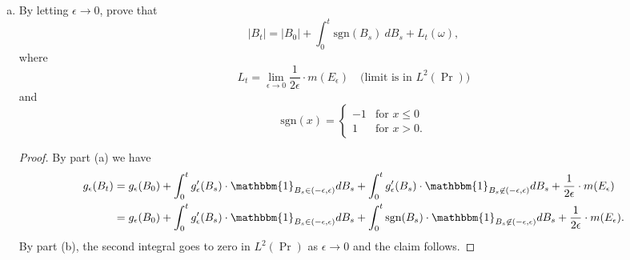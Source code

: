 \documentclass[11pt,letterpaper]{report}
\newcommand{\ind}{\mathbbm{1}}
\newcommand{\sgn}{\text{sgn}}
\begin{document}
\begin{enumerate}[(a)]
	\item By letting $\epsilon\to 0$, prove that
	\[
	|B_t| = |B_0| + \int_0^t \sgn(B_s)\ dB_s + L_t(\omega),
	\]
	where
	\[
	L_t = \lim_{\epsilon\to 0}\frac{1}{2\epsilon}\cdot m(E_\epsilon)\quad\text{(limit is in $L^2(\Pr)$)}
	\]
	and
	\[
	\sgn(x) = \begin{cases}
		-1&\text{for }x\leq 0\\
		1&\text{for }x>0.
	\end{cases}
	\]
	\begin{proof}
		By part (a) we have
		\begin{align*}
		g_\epsilon(B_t) &= g_\epsilon(B_0) + \int_0^tg_\epsilon'(B_s)\cdot \ind_{B_s\in (-\epsilon, \epsilon)}dB_s + \int_0^tg_\epsilon'(B_s)\cdot \ind_{B_s\not\in (-\epsilon, \epsilon)}dB_s + \frac{1}{2\epsilon}\cdot m(E_\epsilon)\\
		&= g_\epsilon(B_0) + \int_0^tg'_\epsilon(B_s)\cdot \ind_{B_s\in (-\epsilon, \epsilon)}dB_s + \int_0^t\sgn(B_s)\cdot \ind_{B_s\not\in (-\epsilon, \epsilon)}dB_s + \frac{1}{2\epsilon}\cdot m(E_\epsilon).
		\end{align*}
		By part (b), the second integral goes to zero in $L^2(\Pr)$ as $\epsilon\to 0$ and the claim follows.
	\end{proof}
\end{enumerate}
\end{document}
